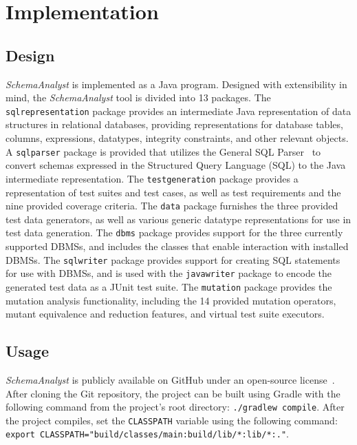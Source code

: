 \section{Implementation}
\subsection{Design}
\textit{SchemaAnalyst} is implemented as a Java program.  Designed with extensibility in mind, the
\textit{SchemaAnalyst} tool is divided into 13 packages. The \texttt{sqlrepresentation} package
provides an intermediate Java representation of data structures in relational databases,
providing representations for database tables, columns, expressions, datatypes, integrity
constraints, and other relevant objects. A \texttt{sqlparser} package is provided that utilizes the
General SQL Parser~\cite{} to convert schemas expressed in the Structured Query Language (SQL) to the
Java intermediate representation. The \texttt{testgeneration} package provides a representation of test
suites and test cases, as well as test requirements and the nine provided coverage criteria. The
\texttt{data} package furnishes the three provided test data generators, as well as various generic
datatype representations for use in test data generation. The \texttt{dbms} package provides support
for the three currently supported DBMSs, and includes the classes that enable interaction with
installed DBMSs. The \texttt{sqlwriter} package provides support for creating SQL statements for use
with DBMSs, and is used with the \texttt{javawriter} package to encode the generated test data as a
JUnit test suite. The \texttt{mutation} package provides the mutation analysis functionality, 
including the 14 provided mutation operators, mutant equivalence and reduction features, and virtual
test suite executors.

\subsection{Usage}

\textit{SchemaAnalyst} is publicly available on GitHub under an open-source license~\cite{tool}. After
cloning the Git repository, the project can be built using Gradle with the following command from the
project's root directory: \lstinline{./gradlew compile}. After the project compiles, set the
\lstinline{CLASSPATH} variable using the following command: 
\lstinline{export CLASSPATH="build/classes/main:build/lib/*:lib/*:."}. 


